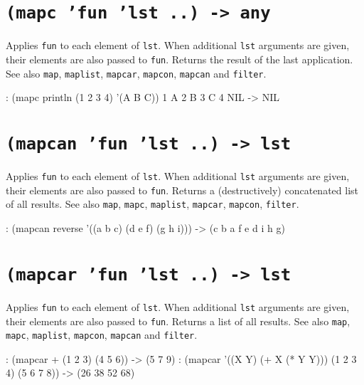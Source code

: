  
\section*{\texttt{(mapc 'fun 'lst ..) -> any}}
\label{sec:func-ref-M-(mapc 'fun 'lst ..) -> any}


Applies \texttt{fun} to each element of \texttt{lst}. When additional \texttt{lst} arguments
are given, their elements are also passed to \texttt{fun}. Returns the result
of the last application. See also \texttt{map}, \texttt{maplist}, \texttt{mapcar}, \texttt{mapcon},
\texttt{mapcan} and \texttt{filter}.


\begin{wideverbatim}
: (mapc println (1 2 3 4) '(A B C))
1 A
2 B
3 C
4 NIL
-> NIL
\end{wideverbatim}

 
\section*{\texttt{(mapcan 'fun 'lst ..) -> lst}}
\label{sec:func-ref-M-(mapcan 'fun 'lst ..) -> lst}


Applies \texttt{fun} to each element of \texttt{lst}. When additional \texttt{lst} arguments
are given, their elements are also passed to \texttt{fun}. Returns a
(destructively) concatenated list of all results. See also \texttt{map},
\texttt{mapc}, \texttt{maplist}, \texttt{mapcar}, \texttt{mapcon}, \texttt{filter}.


\begin{wideverbatim}
: (mapcan reverse '((a b c) (d e f) (g h i)))
-> (c b a f e d i h g)
\end{wideverbatim}

 
\section*{\texttt{(mapcar 'fun 'lst ..) -> lst}}
\label{sec:func-ref-M-(mapcar 'fun 'lst ..) -> lst}


Applies \texttt{fun} to each element of \texttt{lst}. When additional \texttt{lst} arguments
are given, their elements are also passed to \texttt{fun}. Returns a list of
all results. See also \texttt{map}, \texttt{mapc}, \texttt{maplist}, \texttt{mapcon}, \texttt{mapcan} and
\texttt{filter}.


\begin{wideverbatim}
: (mapcar + (1 2 3) (4 5 6))
-> (5 7 9)
: (mapcar '((X Y) (+ X (* Y Y))) (1 2 3 4) (5 6 7 8))
-> (26 38 52 68)
\end{wideverbatim}

